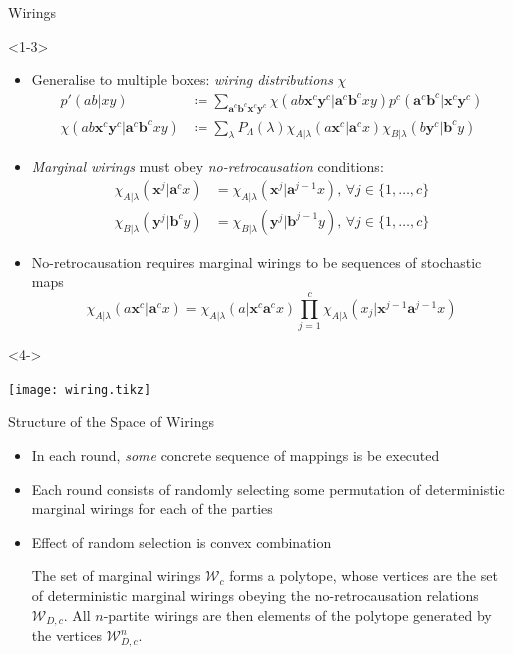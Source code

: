 \documentclass[xcolor=dvipsnames]{beamer}
\newcommand{\dintv}[2]{\mathopen\{#1,\ldots,#2\mathclose\}}
\newcommand{\?}{\mathrel{?}} %
\newcommand{\cvec}[1]{\boldsymbol{\mathbf{#1}}}    %
\newcommand{\sW}{\mathcal{W}}
\begin{document}
\begin{frame}{Wirings}
  \begin{onlyenv}<1-3>
    \begin{itemize}[<+->]
      \item Generalise to multiple boxes: \emph{wiring distributions} \(\chi\)
        \begin{align*}
          p'(ab|xy) &\coloneqq \sum_{\cvec{a}^c\cvec{b}^c\cvec{x}^c\cvec{y}^c} \chi(ab\cvec{x}^c\cvec{y}^c|\cvec{a}^c\cvec{b}^cxy) p^c(\cvec{a}^c\cvec{b}^c|\cvec{x}^c\cvec{y}^c)\label{eqn:jwirdistdef} \\
          \chi(ab\cvec{x}^c\cvec{y}^c|\cvec{a}^c\cvec{b}^cxy) &\coloneqq \sum_{\lambda} P_{\Lambda}(\lambda) \chi_{A|\lambda}(a\cvec{x}^c|\cvec{a}^cx) \chi_{B|\lambda}(b\cvec{y}^c|\cvec{b}^cy)
        \end{align*}
      \item \emph{Marginal wirings} must obey \emph{no-retrocausation} conditions:
        \begin{align*}
          \chi_{A|\lambda}(\cvec{x}^j|\cvec{a}^cx) &= \chi_{A|\lambda}(\cvec{x}^j|\cvec{a}^{j-1}x),\,\forall j \in \dintv{1}{c} \\
          \chi_{B|\lambda}(\cvec{y}^j|\cvec{b}^cy) &= \chi_{B|\lambda}(\cvec{y}^j|\cvec{b}^{j-1}y),\,\forall j \in \dintv{1}{c}
        \end{align*}
      \item No-retrocausation requires marginal wirings to be sequences of stochastic maps
        \[ \chi_{A|\lambda}(a\cvec{x}^c|\cvec{a}^cx) = \chi_{A|\lambda}(a|\cvec{x}^c\cvec{a}^{c}x) \prod_{j=1}^c \chi_{A|\lambda}(x_j|\cvec{x}^{j-1}\cvec{a}^{j-1}x) \]
    \end{itemize}
  \end{onlyenv}
  \begin{onlyenv}<4->
    \begin{center}
      \texttt{[image: wiring.tikz]}
    \end{center}
  \end{onlyenv}
\end{frame}

\begin{frame}{Structure of the Space of Wirings}
  \begin{itemize}[<+->]
    \item In each round, \emph{some} concrete sequence of mappings is be executed
    \item Each round consists of randomly selecting some permutation of deterministic marginal wirings for each of the parties
    \item Effect of random selection is convex combination
      \begin{theorem}
        The set of marginal wirings \(\sW_c\) forms a polytope, whose vertices are the set of deterministic marginal wirings obeying the no-retrocausation relations \(\sW_{D,c}\). All \(n\)-partite wirings are then elements of the polytope generated by the vertices \(\sW_{D,c}^n\).
      \end{theorem}
  \end{itemize}
\end{frame}
\end{document}
